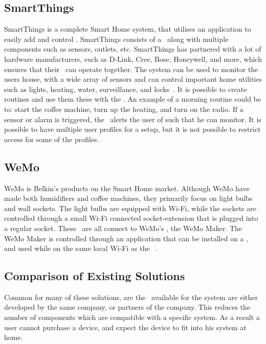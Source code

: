 \subsection{SmartThings} \label{sec:smartthings}
SmartThings is a complete Smart Home system, that utilises an application to easily add and control \sdevs. SmartThings consists of a \hub~along with multiple components such as sensors, outlets, etc. SmartThings has partnered with a lot of hardware manufacturers, such as D-Link, Cree, Bose, Honeywell, and more, which ensures that their \sdevs~can operate together. The system can be used to monitor the users house, with a wide array of sensors and can control important home utilities such as lights, heating, water, surveillance, and locks~\citep{smartthings}. It is possible to create routines and use them these with the \phone. An example of a morning routine could be to: start the coffee machine, turn up the heating, and turn on the radio. If a sensor or alarm is triggered, the \phone~alerts the user of such that he can monitor\citep{smartthings-howto}. It is possible to have multiple user profiles for a setup, but it is not possible to restrict access for some of the profiles.  

\subsection{WeMo} \label{sec:wemo}
WeMo is Belkin's products on the Smart Home market. Although WeMo have made both humidifiers and coffee machines, they primarily focus on light bulbs and wall sockets. The light bulbs are equipped with Wi-Fi, while the sockets are controlled through a small Wi-Fi connected socket-extension that is plugged into a regular socket. These \sdevs~are all connect to WeMo's \hub, the WeMo Maker. The WeMo Maker is controlled through an application that can be installed on a \phone, and used while on the same local Wi-Fi as the \hub~\citep{wemo-smarthome}.


\subsection{Comparison of Existing Solutions}\label{sec:comparison-existing-solutions}
Common for many of these solutions, are the \sdevs~available for the system are either developed by the same company, or partners of the company. This reduces the number of components which are compatible with a specific system. As a result a user cannot purchase a device, and expect the device to fit into his system at home. 

